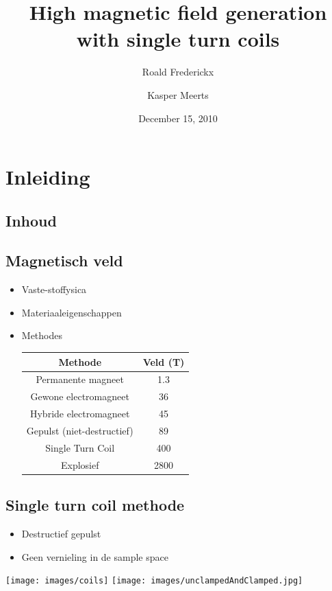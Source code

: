 \documentclass{beamer}
\title{High magnetic field generation with single turn coils}
\author{Roald Frederickx \and Kasper Meerts}
\date{December 15, 2010}
\begin{document}
\begin{frame}
\titlepage
\end{frame}

\section{Inleiding}
\subsection{Inhoud}
\begin{frame}
\tableofcontents[hideallsubsections]
\end{frame}

\subsection{Magnetisch veld}
\begin{frame}
\begin{itemize}
\item Vaste-stoffysica
\item Materiaaleigenschappen
\item Methodes
\begin{table}
\begin{center}
\begin{tabular}{c|c}
Methode & Veld (T) \\
\hline
Permanente magneet & 1.3\\
Gewone electromagneet & 36\\
Hybride electromagneet & 45\\
Gepulst (niet-destructief) & 89\\
Single Turn Coil & 400\\
Explosief & 2800 \\
\end{tabular}
\end{center}
\end{table}
\end{itemize}
\end{frame}

\subsection{Single turn coil methode}
\begin{frame}
\begin{itemize}
\item Destructief gepulst
\item Geen vernieling in de sample space
\end{itemize}
\begin{center}
\texttt{[image: images/coils]}
\quad
\texttt{[image: images/unclampedAndClamped.jpg]}
\end{center}
\end{frame}
\end{document}
